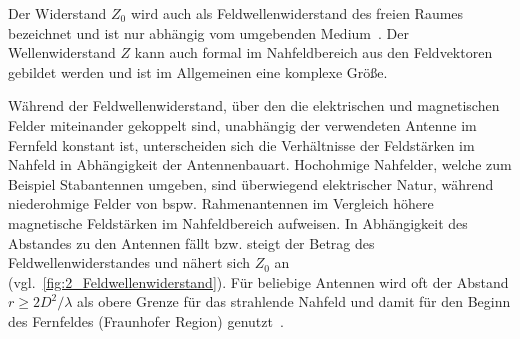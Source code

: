 Der Widerstand $Z_0$ wird auch als Feldwellenwiderstand des freien Raumes bezeichnet und ist nur abhängig vom umgebenden Medium~\cite{EMV}. Der Wellenwiderstand $Z$ kann auch formal im Nahfeldbereich aus den Feldvektoren gebildet werden und ist im Allgemeinen eine komplexe Größe.
\par
\vspace{\linespace}
Während der Feldwellenwiderstand, über den die elektrischen und magnetischen Felder miteinander gekoppelt sind, unabhängig der verwendeten Antenne im Fernfeld konstant ist, unterscheiden sich die Verhältnisse der Feldstärken im Nahfeld in Abhängigkeit der Antennenbauart. Hochohmige Nahfelder, welche zum Beispiel Stabantennen umgeben, sind überwiegend elektrischer Natur, während niederohmige Felder von bspw. Rahmenantennen im Vergleich höhere magnetische Feldstärken im Nahfeldbereich aufweisen. In Abhängigkeit des Abstandes zu den Antennen fällt bzw. steigt der Betrag des Feldwellenwiderstandes und nähert sich $Z_0$ an (vgl.~\Abb\ref{fig:2_Feldwellenwiderstand}). Für beliebige Antennen wird oft der Abstand $r\geq 2 D^2 / \lambda$ als obere Grenze für das strahlende Nahfeld und damit für den Beginn des Fernfeldes (Fraunhofer Region) genutzt~\cite{Antenna_Theory}.  


